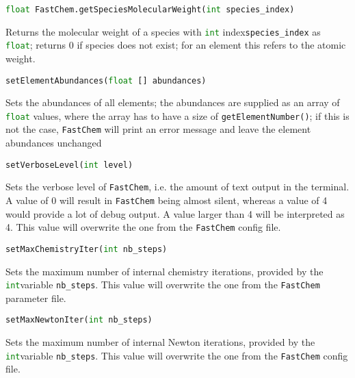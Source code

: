 \documentclass[numbers=noenddot]{aux/fcmanual}
\newcommand{\fc}{\texttt{FastChem}\xspace}
\begin{document}
\bigbreak

\lstinline[language=Python]!float FastChem.getSpeciesMolecularWeight(int species_index)!
\begin{addmargin}[25pt]{0pt}
	Returns the molecular weight of a species with \lstinline[language=Python]!int! index\footnotemark[\value{footnote}] \lstinline!species_index! as \lstinline[language=Python]!float!; returns 0 if species does not exist; for an element this refers to the atomic weight.
\end{addmargin}


\bigbreak

\lstinline[language=Python]!setElementAbundances(float [] abundances)!
\begin{addmargin}[25pt]{0pt}
	Sets the abundances of all elements; the abundances are supplied as an array of \lstinline[language=Python]!float! values, where the array has to have a size of \lstinline[language=Python]!getElementNumber()!; if this is not the case, \fc will print an error message and leave the element abundances unchanged
\end{addmargin}

\bigbreak

\lstinline[language=Python]!setVerboseLevel(int level)!
\begin{addmargin}[25pt]{0pt}
	Sets the verbose level of \fc, i.e. the amount of text output in the terminal. A value of 0 will result in \fc being almost silent, whereas a value of 4 would provide a lot of debug output. A value larger than 4 will be interpreted as 4. This value will overwrite the one from the \fc config file.
\end{addmargin}

\bigbreak

\lstinline[language=Python]!setMaxChemistryIter(int nb_steps)!
\begin{addmargin}[25pt]{0pt}
	Sets the maximum number of internal chemistry iterations, provided by the \lstinline[language=Python]!int!\footnotemark[\value{footnote}] variable \lstinline!nb_steps!. This value will overwrite the one from the \fc parameter file.
\end{addmargin}

\bigbreak

\lstinline[language=Python]!setMaxNewtonIter(int nb_steps)!
\begin{addmargin}[25pt]{0pt}
	Sets the maximum number of internal Newton iterations, provided by the \lstinline[language=Python]!int!\footnotemark[\value{footnote}] variable \lstinline!nb_steps!. This value will overwrite the one from the \fc config file.
\end{addmargin}
\end{document}
